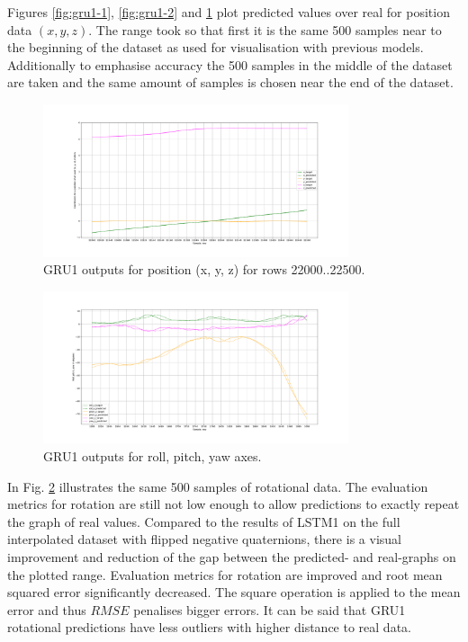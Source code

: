 Figures \ref{fig:gru1-1}, \ref{fig:gru1-2} and \ref{fig:gru1-3} plot predicted values over real for position data $(x, y, z)$. The range took so that first it is the same 500 samples near to the beginning of the dataset as used for visualisation with previous models. Additionally to emphasise accuracy the 500 samples in the middle of the dataset are taken and the same amount of samples is chosen near the end of the dataset. 
\begin{figure}[t!]
	\begin{center}
		\includegraphics[width=0.8\textwidth, keepaspectratio]{gfx/gru1-xyz_position_21000.pdf}
		\caption{GRU1 outputs for position (x, y, z) for rows 22000..22500.}
		\label{fig:gru1-3}
	\end{center}
\end{figure}
\begin{figure}[t!]
	\begin{center}
		\includegraphics[width=0.8\textwidth, keepaspectratio]{gfx/gru1-roll_pitch_yaw_accuracy.pdf}
		\caption{GRU1 outputs for roll, pitch, yaw axes.}
		\label{fig:gru1-4}
	\end{center}
\end{figure}
In Fig. \ref{fig:gru1-4} illustrates the same 500 samples of rotational data. The evaluation metrics for rotation are still not low enough to allow predictions to exactly repeat the graph of real values. Compared to the results of LSTM1 on the full interpolated dataset with flipped negative quaternions, there is a visual improvement and reduction of the gap between the predicted- and real-graphs on the plotted range. Evaluation metrics for rotation are improved and root mean squared error significantly decreased. The square operation is applied to the mean error and thus $RMSE$ penalises bigger errors. It can be said that GRU1 rotational predictions have less outliers with higher distance to real data.

